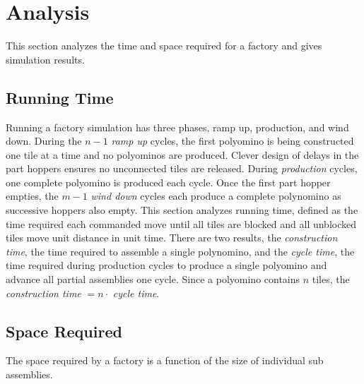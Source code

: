 



\section{Analysis}\label{sec:Analysis}
This section analyzes the time and space required for a factory and gives simulation results.


\subsection{Running Time}\label{sec:runningTime}
Running a factory simulation has three phases, ramp up, production, and wind down.
During the $n-1$ \emph{ramp up}  cycles, the first polyomino is being constructed one tile at a time and no polyominos are produced.
Clever design of delays in the part hoppers ensures no unconnected tiles are released.
During \emph{production} cycles, one complete polyomino is produced each cycle.
Once the first part hopper empties, the $m-1$ \emph{wind down}  cycles each produce a complete polynomino as successive hoppers also empty.
 This section analyzes running time, defined as the time required each commanded move until all tiles are blocked and all unblocked tiles move unit distance in unit time.
 There are two results, the \emph{construction time}, the time required to assemble a single polynomino, and
 the \emph{cycle time}, the time required during production cycles to produce a single polyomino and advance all partial assemblies one cycle.
 Since a polyomino contains $n$ tiles, the \emph{construction time} $= n \cdot$ \emph{cycle time}.
 



\subsection{Space Required}\label{sec:requiredSpace}
The space required by a factory is a function of the size of individual sub assemblies.

